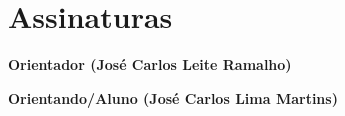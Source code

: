 \documentclass{article}
\begin{document}
\printbibliography

\section*{Assinaturas}

\large

\vspace{0.5cm}

\textbf{Orientador (José Carlos Leite Ramalho)}

\vspace{0.5cm}

\dotfill

\vspace{1cm}

\textbf{Orientando/Aluno (José Carlos Lima Martins)}

\vspace{0.5cm}

\dotfill
\end{document}
